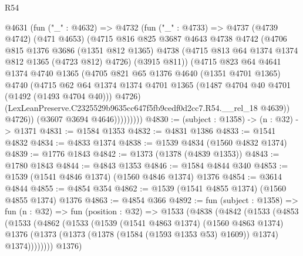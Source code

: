 \begin{lexlean}{R54}
\begin{coremodule}
              @4631
                (fun ("_" : @4632) =>
                @4732
                  (fun ("_" : @4733) =>
                  @4737
                    (@4739 @4742)
                    (@471 @4653)
                    (@4715
                      @816
                      @825
                      @3687
                      @4643
                      @4738
                      @4742
                      (@4706
                        @815
                        @1376
                        @3686
                        (@1351 @812 @1365)
                        @4738
                        (@4715 @813 @64 @1374 @1374 @812 @1365 (@4723 @812) @4726)
                        (@3915 @811))
                      (@4715
                        @823
                        @64
                        @4641
                        @1374
                        @4740
                        @1365
                        (@4705
                          @821
                          @65
                          @1376
                          @4640
                          (@1351 @4701 @1365)
                          @4740
                          (@4715
                            @62
                            @64
                            @1374
                            @1374
                            @4701
                            @1365
                            (@1487 @4704 @40 @4701 (@1492 (@1493 @4704 @40)))
                            @4726)
                          (LexLeanPreserve.C2325529b9635cc647f5fb9cedf0d2cc7.R54.__rel_18 @4639))
                        @4726))
                    (@3607 @3694 @4646)))))))))
@4830 := (subject : @1358) -> (n : @32) -> @1371
@4831 := @1584 @1353
@4832 := @4831 @1386
@4833 := @1541 @4832
@4834 := @4833 @1374
@4838 := @1539 @4834 (@1560 @4832 @1374)
@4839 := @1776 @1843
@4842 := @1373 (@1378 (@4839 @1353))
@4843 := @1780 @1843
@4844 := @4843 @1353
@4846 := @1584 @4844 @340
@4853 := @1539 (@1541 @4846 @1374) (@1560 @4846 @1374) @1376
@4854 := @3614 @4844
@4855 := @4854 @354
@4862 := @1539 (@1541 @4855 @1374) (@1560 @4855 @1374) @1376
@4863 := @4854 @366
@4892 := fun (subject : @1358) =>
  fun (n : @32) =>
  fun (position : @32) =>
  @1533
    (@4838
      (@4842
        (@1533
          (@4853
            (@1533
              (@4862
                (@1533
                  (@1539
                    (@1541 @4863 @1374)
                    (@1560 @4863 @1374)
                    @1376
                    (@1373 (@1373 (@1378 (@1584 (@1593 @1353 @53) @1609)) @1374) @1374))))))))
      @1376)

\end{coremodule}
\end{lexlean}
